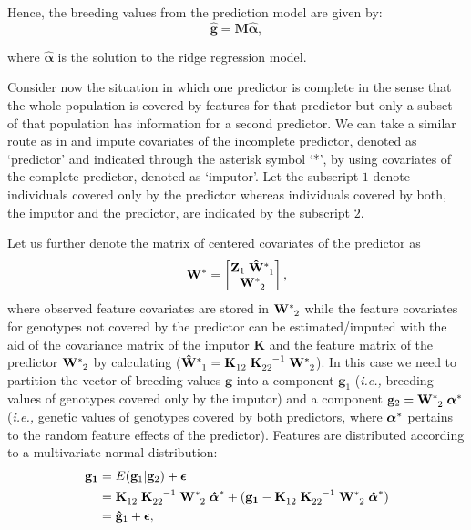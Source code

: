\documentclass[12pt,titlepage]{article}
\begin{document}
Hence, the breeding values from the prediction model are given by:
\begin{equation} \label{eq:mrnaebv}
	\mathbf{\hat{g}} = \mathbf{M}\boldsymbol{\hat{\alpha}},
\end{equation}

where $\boldsymbol{\hat{\alpha}}$ is the solution to the ridge regression model.

Consider now the situation in which one predictor is complete in the sense that
the whole population is covered by features for that predictor but only a subset
of that population has information for a second predictor.
We can take a similar route as in  and impute covariates 
of the incomplete predictor, denoted as `predictor' and indicated through the
asterisk symbol `*', by using covariates of the complete predictor, denoted as
`imputor'.
Let the subscript $1$ denote individuals covered only by the predictor whereas
individuals covered by both, the imputor and the predictor, are indicated by the subscript $2$.

Let us further denote the matrix of centered covariates of the predictor as
\begin{equation} \label{eq:incomplete-covariates}
\tensor[]{\mathbf{W}}{^{*}} =
\begin{bmatrix}
  \mathbf{Z}_{1} \; \tensor[]{\mathbf{\hat{W}}}{^{*}_{1}} \\
  \tensor[]{\mathbf{W}}{^{*}_{2}}
 \end{bmatrix},
\end{equation}
where observed feature covariates are stored in $\tensor[]{\mathbf{W}}{^{*}_{2}}$
while the feature covariates for genotypes not covered by the predictor can be estimated/imputed with the aid of the covariance matrix of the
imputor $\mathbf{K}$ and the feature matrix of the predictor 
$\tensor[]{\mathbf{W}}{^{*}_{2}}$ by calculating
($\tensor[]{\mathbf{\hat{W}}}{^{*}_{1}} = \tensor[]{\mathbf{K}}{_{12}} \;
\tensor[]{\mathbf{K}}{_{22}^{-1}} \; \tensor[]{\mathbf{W}}{^{*}_{2}}$).
In this case we need to partition the vector of breeding values $\mathbf{g}$
into a component $\mathbf{g}_{1}$ (\textit{i.e.,} breeding values of genotypes
covered only by the imputor) and a component
$\mathbf{g}_{2} = \tensor[]{\mathbf{W}}{^{*}_{2}} \; 
\tensor[]{\boldsymbol{\alpha}}{^{*}}$ (\textit{i.e.,} genetic
values of genotypes covered by both predictors, where
$\tensor[]{\boldsymbol{\alpha}}{^{*}}$ pertains to the random feature effects of
the predictor).
Features are distributed according to a multivariate normal distribution:
\begin{align} \label{eq:mrna1}
	\mathbf{g_1} &= E(\mathbf{g}_1|\mathbf{g}_2) +
	\boldsymbol{\epsilon} \\
	&= \tensor[]{\mathbf{K}}{_{12}} \;
       	\tensor[]{\mathbf{K}}{_{22}^{-1}} \;
       	\tensor[]{\mathbf{W}}{^{*}_{2}} \;
	\tensor[]{\boldsymbol{\hat{\alpha}}}{^{*}} +
       	(\mathbf{g_1} - \tensor[]{\mathbf{K}}{_{12}} \;
	\tensor[]{\mathbf{K}}{_{22}^{-1}} \;
       	\tensor[]{\mathbf{W}}{^{*}_{2}} \;
	\tensor[]{\boldsymbol{\hat{\alpha}}}{^{*}}) \\
	&= \mathbf{\hat{g}}_1 + \boldsymbol{\epsilon},
\end{align}
\end{document}
